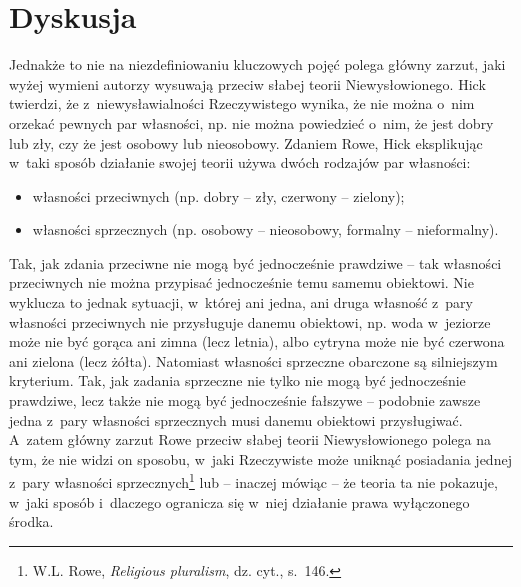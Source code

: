 \section{Dyskusja}

Jednakże to nie na niezdefiniowaniu kluczowych pojęć polega główny zarzut, jaki wyżej wymieni autorzy wysuwają przeciw słabej teorii Niewysłowionego. Hick twierdzi, że z~niewysławialności Rzeczywistego wynika, że nie można o~nim orzekać pewnych par własności, np. nie można powiedzieć o~nim, że jest dobry lub zły, czy że jest osobowy lub nieosobowy. Zdaniem Rowe, Hick eksplikując w~taki sposób działanie swojej teorii używa dwóch rodzajów par własności:

\begin{itemize}
\item własności przeciwnych (np. dobry -- zły, czerwony -- zielony);
\item własności sprzecznych (np. osobowy -- nieosobowy, formalny -- nieformalny).
\end{itemize}
Tak, jak zdania przeciwne nie mogą być jednocześnie prawdziwe -- tak własności przeciwnych nie można przypisać jednocześnie temu samemu obiektowi. Nie wyklucza to jednak sytuacji, w~której ani jedna, ani druga własność z~pary własności przeciwnych nie przysługuje danemu obiektowi, np. woda w~jeziorze może nie być gorąca ani zimna (lecz letnia), albo cytryna może nie być czerwona ani zielona (lecz żółta). Natomiast własności sprzeczne obarczone są silniejszym kryterium. Tak, jak zadania sprzeczne nie tylko nie mogą być jednocześnie prawdziwe, lecz także nie mogą być jednocześnie fałszywe -- podobnie zawsze jedna z~pary własności sprzecznych musi danemu obiektowi przysługiwać. A~zatem główny zarzut Rowe przeciw słabej teorii Niewysłowionego polega na tym, że nie widzi on sposobu, w~jaki Rzeczywiste może uniknąć posiadania jednej z~pary własności sprzecznych\footnote{W.L. Rowe, \textit{Religious pluralism}, dz. cyt., s.~146.} lub -- inaczej mówiąc -- że teoria ta nie pokazuje, w~jaki sposób i~dlaczego ogranicza się w~niej działanie prawa wyłączonego środka.


